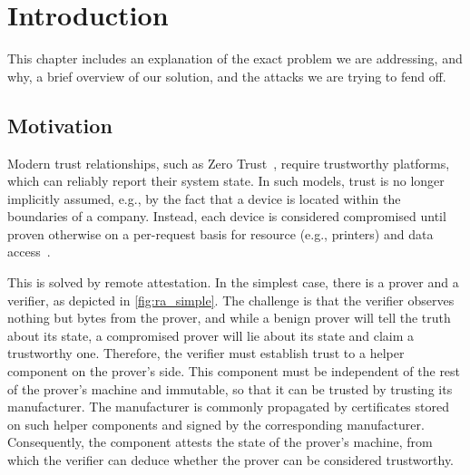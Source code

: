 
\chapter{Introduction}\label{chapter:introduction}

This chapter includes an explanation of the exact problem we are addressing, and why, a brief overview of our solution, and the attacks we are trying to fend off.


\section{Motivation}


Modern trust relationships, such as Zero Trust~\cite{isaca2021}, require trustworthy platforms, which can reliably report their system state.
In such models, trust is no longer implicitly assumed, e.g., by the fact that a device is located within the boundaries of a company.
Instead, each device is considered compromised until proven otherwise on a per-request basis for resource (e.g., printers) and data access~\cite{Rose2020}.


This is solved by remote attestation.
In the simplest case, there is a prover and a verifier, as depicted in \autoref{fig:ra_simple}.
The challenge is that the verifier observes nothing but bytes from the prover, and while a benign prover will tell the truth about its state, a compromised prover will lie about its state and claim a trustworthy one.
Therefore, the verifier must establish trust to a helper component on the prover's side.
This component must be independent of the rest of the prover's machine and immutable, so that it can be trusted by trusting its manufacturer.
The manufacturer is commonly propagated by certificates stored on such helper components and signed by the corresponding manufacturer.
Consequently, the component attests the state of the prover's machine, from which the verifier can deduce whether the prover can be considered trustworthy.



